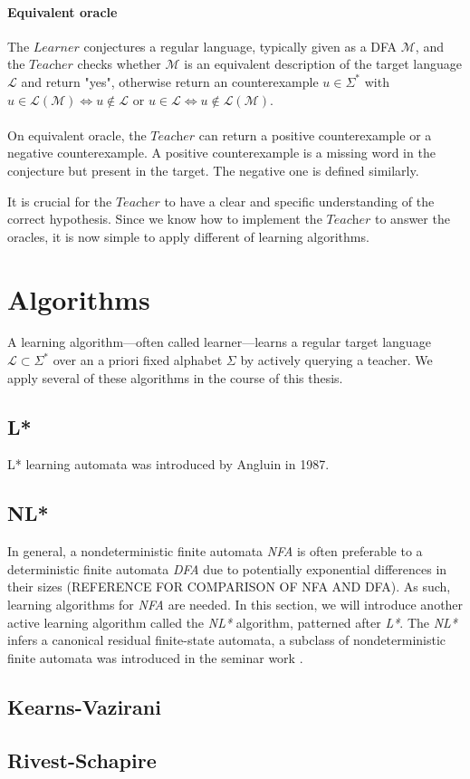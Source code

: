 \paragraph*{Equivalent oracle} 
The $\textit{Learner}$ conjectures a regular language, typically given as a DFA $\mathcal{M}$, 
and the $\textit{Teacher}$ checks whether $\mathcal{M}$ is an equivalent description of the target 
language $\mathcal{L}$ and return "yes", otherwise return an counterexample $u \in \Sigma^{*}$ with 
$u \in \mathcal{L}(\mathcal{M}) \Longleftrightarrow u \notin \mathcal{L}$ or 
$u \in \mathcal{L} \Longleftrightarrow u \notin \mathcal{L}(\mathcal{M})$.
\paragraph*{}
On equivalent oracle, the $\textit{Teacher}$ can return a positive counterexample or a negative counterexample.
A positive counterexample is a missing word in the conjecture but present in the target.
The negative one is defined similarly.

It is crucial for the $\textit{Teacher}$ to have a clear and specific understanding of the 
correct hypothesis.
Since we know how to implement the $\textit{Teacher}$ to answer the oracles, it is now simple 
to apply different of learning algorithms.
\section{Algorithms}\label{section:learner_learning}
A learning algorithm—often called learner—learns a regular target 
language $\mathcal{L} \subset \Sigma^{*}$ over an a priori fixed alphabet $\Sigma$ by actively querying a teacher.
We apply several of these algorithms in the course of this thesis.
\subsection{L*}
L* learning automata was introduced by Angluin in 1987.
\subsection{NL*}
In general, a nondeterministic finite automata \textit{NFA} is often preferable to a 
deterministic finite automata \textit{DFA} due to potentially exponential 
differences in their sizes (REFERENCE FOR COMPARISON OF NFA AND DFA). As such, 
learning algorithms for \textit{NFA} are needed.
In this section, we will introduce another active learning algorithm called the \textit{NL*} algorithm,
patterned after \textit{L*}. The \textit{NL*} infers a canonical residual finite-state automata, 
a subclass of nondeterministic finite automata was introduced in the seminar work \cite*{clarke2009model}.
\subsection{Kearns-Vazirani}
\subsection{Rivest-Schapire}